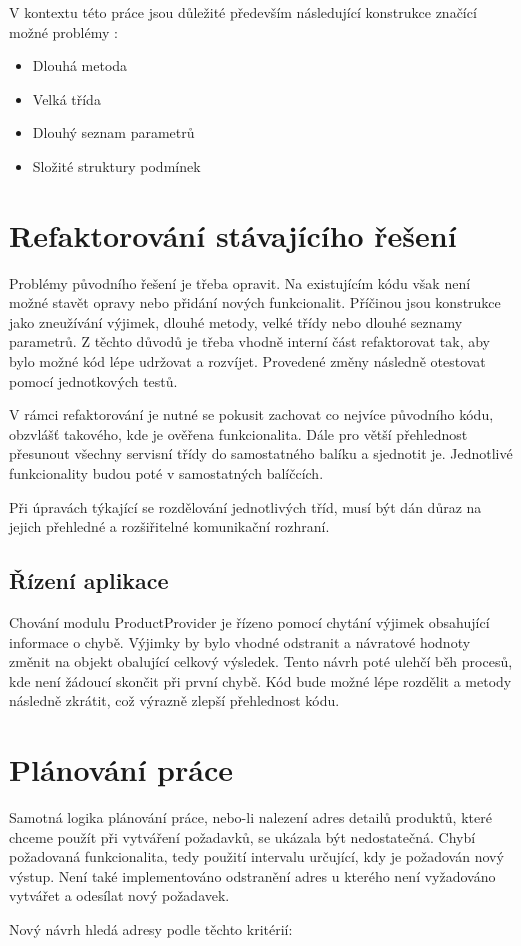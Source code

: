 \documentclass[thesis=B,czech]{FITthesis}[2012/06/26]
\begin{document}
V kontextu této práce jsou důležité především následující konstrukce značící možné problémy \cite{refaktoring}:  
\begin{itemize}
\item Dlouhá metoda
\item Velká třída
\item Dlouhý seznam parametrů
\item Složité struktury podmínek
\end{itemize}

\section{Refaktorování stávajícího řešení}
Problémy původního řešení je třeba opravit. Na existujícím kódu však není možné stavět opravy nebo přidání nových funkcionalit. Příčinou jsou konstrukce jako zneužívání výjimek, dlouhé metody, velké třídy nebo dlouhé seznamy parametrů.
Z těchto důvodů je třeba vhodně interní část refaktorovat tak, aby bylo možné kód lépe udržovat a rozvíjet. Provedené změny následně 
otestovat pomocí jednotkových testů.
\par
V rámci refaktorování je nutné se pokusit zachovat co nejvíce původního kódu, obzvlášť takového, kde je ověřena funkcionalita.
Dále pro větší přehlednost přesunout všechny servisní třídy do samostatného balíku a sjednotit je. Jednotlivé funkcionality
budou poté v samostatných balíčcích.
\par
Při úpravách týkající se rozdělování jednotlivých tříd, musí být dán důraz na jejich přehledné a rozšiřitelné komunikační rozhraní.

\subsection{Řízení aplikace}
Chování modulu ProductProvider je řízeno pomocí chytání výjimek obsahující informace o chybě. 
Výjimky by bylo vhodné odstranit a návratové hodnoty změnit na objekt obalující celkový výsledek. Tento návrh poté ulehčí běh procesů, kde není žádoucí
skončit při první chybě. Kód bude možné lépe rozdělit a metody následně zkrátit, což výrazně zlepší přehlednost kódu.

\section{Plánování práce}
Samotná logika plánování práce, nebo-li nalezení adres detailů produktů, které chceme použít při vytváření požadavků, se ukázala být nedostatečná. Chybí požadovaná funkcionalita, tedy použití intervalu určující, kdy je požadován nový výstup. Není také implementováno odstranění adres u kterého není vyžadováno vytvářet a odesílat nový požadavek.
\par
Nový návrh hledá adresy podle těchto kritérií:
\end{document}
